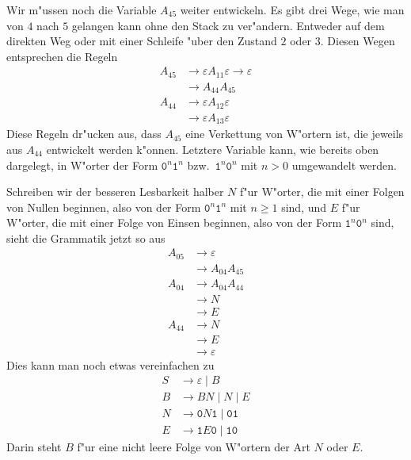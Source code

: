 \begin{loesung}
Wir m"ussen noch die Variable $A_{45}$ weiter entwickeln. Es gibt
drei Wege, wie man von $4$ nach $5$ gelangen kann ohne den
Stack zu ver"andern. Entweder auf dem direkten Weg oder mit
einer Schleife "uber den Zustand $2$ oder $3$.
Diesen Wegen entsprechen die Regeln
\begin{align*}
A_{45}&\to\varepsilon A_{11}\varepsilon\to\varepsilon\\
      &\to A_{44}A_{45}\\
A_{44}&\to\varepsilon A_{12}\varepsilon\\
      &\to\varepsilon A_{13}\varepsilon
\end{align*}
Diese Regeln dr"ucken aus, dass $A_{45}$ eine Verkettung von W"ortern
ist, die jeweils aus $A_{44}$ entwickelt werden k"onnen.
Letztere Variable kann, wie bereits oben dargelegt,
in W"orter der Form $\texttt{0}^n\texttt{1}^n$ bzw.~$\texttt{1}^n\texttt{0}^n$
mit $n>0$ umgewandelt werden.

Schreiben wir der besseren Lesbarkeit halber $N$ f"ur W"orter, die mit
einer Folgen von Nullen beginnen, also von der
Form $\texttt{0}^n\texttt{1}^n$ mit $n\ge 1$ sind, und $E$ f"ur W"orter,
die mit einer Folge von Einsen beginnen, also von der
Form $\texttt{1}^n\texttt{0}^n$ sind, sieht die Grammatik jetzt so aus
\begin{align*}
A_{05}&\to\varepsilon \\
      &\to A_{04}A_{45} \\
A_{04}&\to A_{04}A_{44} \\
      &\to N \\
      &\to E \\
A_{44}&\to N \\
      &\to E \\
      &\to \varepsilon
\end{align*}
Dies kann man noch etwas vereinfachen zu
\begin{align*}
S&\to \varepsilon\;|\; B\\
B&\to BN\;|\;N\;|\;E\\
N&\to \texttt{0}N\texttt{1}\;|\; \texttt{01}\\
E&\to \texttt{1}E\texttt{0}\;|\; \texttt{10}
\end{align*}
Darin steht $B$ f"ur eine nicht leere Folge von W"ortern der Art $N$
oder $E$.
\end{loesung}


